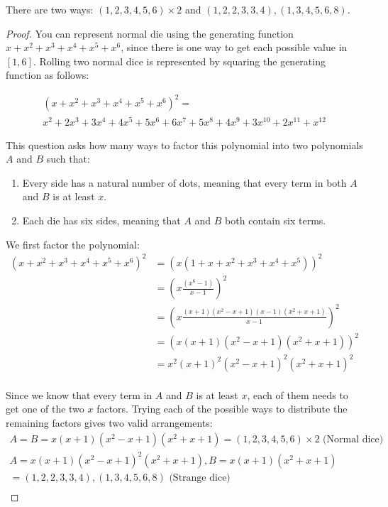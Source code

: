 \documentclass[12pt]{article}
\begin{document}
There are two ways: $(1,2,3,4,5,6)\times2$ and $(1,2,2,3,3,4), (1,3,4,5,6,8)$.
\begin{proof}
You can represent normal die using the generating function $x + x^2 + x^3 + x^4 + x^5 + x^6$, since there is one way to get each possible value in $[1,6]$. Rolling two normal dice is represented by squaring the generating function as follows:

\begin{multline*}
(x + x^2 + x^3 + x^4 + x^5 + x^6)^2 = \\x^2+2 x^3+3 x^4+4 x^5+5 x^6+6 x^7+5 x^8+4 x^9+3 x^{10}+2x^{11}+x^{12}
\end{multline*}

This question asks how many ways to factor this polynomial into two polynomials $A$ and $B$ such that:
\begin{enumerate}
    \item Every side has a natural number of dots, meaning that every term in both $A$ and $B$ is at least $x$.
    \item Each die has six sides, meaning that $A$ and $B$ both contain six terms. 
\end{enumerate}

We first factor the polynomial:
\begin{align*}
    (x + x^2 + x^3 + x^4 + x^5 + x^6)^2 &= \left(x(1 + x + x^2 + x^3 + x^4 + x^5)\right)^2\\
    &= \left(x\frac{(x^6-1)}{x-1}\right)^2\\
    &= \left(x\frac{(x + 1)(x^2 - x + 1)(x-1)(x^2+x+1)}{x-1}\right)^2\\
    &= \left(x(x + 1)(x^2 - x + 1)(x^2+x+1)\right)^2\\
    &= x^2(x + 1)^2(x^2 - x + 1)^2(x^2+x+1)^2\\
\end{align*}

Since we know that every term in $A$ and $B$ is at least $x$, each of them needs to get one of the two $x$ factors. Trying each of the possible ways to distribute the remaining factors gives two valid arrangements:
\begin{multline*}
    A = B = x(x+1)(x^2 - x + 1)(x^2+x+1) = (1,2,3,4,5,6)\times 2 \text{ (Normal dice)}\\
    A = x(x+1)(x^2 - x + 1)^2(x^2+x+1), B = x(x+1)(x^2+x+1)\\
    = (1,2,2,3,3,4), (1,3,4,5,6,8) \text{ (Strange dice)}\\
\end{multline*}
\end{proof}
\end{document}
